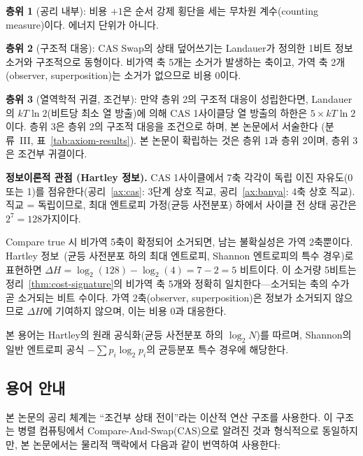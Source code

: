 \documentclass[entropy,article,submit,pdftex,oneauthor]{Definitions/mdpi}
\begin{document}
\textbf{층위 1} (공리 내부): 비용 $+1$은 순서 강제 횡단을 세는 무차원 계수(counting measure)이다. 에너지 단위가 아니다.

\textbf{층위 2} (구조적 대응): CAS Swap의 상태 덮어쓰기는 Landauer가 정의한 1비트 정보 소거와 구조적으로 동형이다. 비가역 축 5개는 소거가 발생하는 축이고, 가역 축 2개(observer, superposition)는 소거가 없으므로 비용 $0$이다.

\textbf{층위 3} (열역학적 귀결, 조건부): 만약 층위 2의 구조적 대응이 성립한다면, Landauer의 $kT\ln 2$(비트당 최소 열 방출)에 의해 CAS 1사이클당 열 방출의 하한은 $5 \times kT\ln 2$이다. 층위 3은 층위 2의 구조적 대응을 조건으로 하며, 본 논문에서 서술한다 (분류~III, 표~\ref{tab:axiom-results}). 본 논문이 확립하는 것은 층위 1과 층위 2이며, 층위 3은 조건부 귀결이다.

\textbf{정보이론적 관점 (Hartley 정보).} CAS 1사이클에서 7축 각각이 독립 이진 자유도(0 또는 1)를 점유한다(공리~\ref{ax:cas}: 3단계 상호 직교, 공리~\ref{ax:banya}: 4축 상호 직교). 직교 = 독립이므로, 최대 엔트로피 가정(균등 사전분포) 하에서 사이클 전 상태 공간은 $2^7 = 128$가지이다.

Compare true 시 비가역 5축이 확정되어 소거되면, 남는 불확실성은 가역 2축뿐이다. Hartley 정보~\cite{hartley1928}(균등 사전분포 하의 최대 엔트로피, Shannon 엔트로피의 특수 경우)로 표현하면 $\Delta H = \log_2(128) - \log_2(4) = 7 - 2 = 5$ 비트이다. 이 소거량 5비트는 정리~\ref{thm:cost-signature}의 비가역 축 5개와 정확히 일치한다---소거되는 축의 수가 곧 소거되는 비트 수이다. 가역 2축(observer, superposition)은 정보가 소거되지 않으므로 $\Delta H$에 기여하지 않으며, 이는 비용 $0$과 대응한다.

본 용어는 Hartley의 원래 공식화(균등 사전분포 하의 $\log_2 N$)를 따르며, Shannon의 일반 엔트로피 공식 $-\sum p_i \log_2 p_i$의 균등분포 특수 경우에 해당한다.

\subsection{용어 안내}

본 논문의 공리 체계는 ``조건부 상태 전이''라는 이산적 연산 구조를 사용한다. 이 구조는 병렬 컴퓨팅에서 Compare-And-Swap(CAS)으로 알려진 것과 형식적으로 동일하지만, 본 논문에서는 물리적 맥락에서 다음과 같이 번역하여 사용한다:
\end{document}
